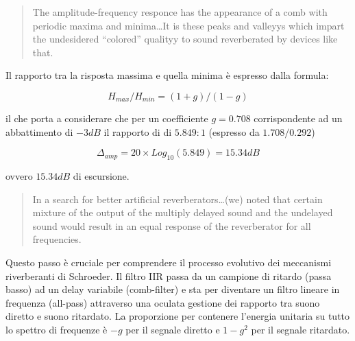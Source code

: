 \begin{refsection}
\begin{quote}
  The amplitude-frequency responce has the appearance of a comb with periodic
  maxima and minima\ldots It is these peaks and valleyys which impart the undesidered
  “colored” qualityy to sound reverberated by devices like that.
\end{quote}

Il rapporto tra la risposta massima e quella minima è espresso dalla formula:

\begin{equation}
  \label{comb-filter}
  H_{max}/H_{min} = (1+g)/(1-g)
\end{equation}

il che porta a considerare che per un coefficiente $g=0.708$ corrispondente ad
un abbattimento di $-3dB$ il rapporto di di $5.849:1$ (espresso da $1.708/0.292$)

\begin{equation}
  \label{hmax}
  \Delta_{amp} = 20\times Log_10(5.849) = 15.34 dB
\end{equation}

ovvero $15.34dB$ di escursione.

\begin{quote}
  In a search for better artificial reverberators\ldots (we) noted that certain
  mixture of the output of the multiply delayed sound and the undelayed sound
  would result in an equal response of the reverberator for all frequencies.
\end{quote}

Questo passo è cruciale per comprendere il processo evolutivo dei meccanismi
riverberanti di Schroeder. Il filtro IIR passa da un campione di ritardo (passa
basso) ad un delay variabile (comb-filter) e sta per diventare un filtro
lineare in frequenza (all-pass) attraverso una oculata gestione dei rapporto tra
suono diretto e suono ritardato. La proporzione per contenere l'energia unitaria
su tutto lo spettro di frequenze è $-g$ per il segnale diretto e $1-g^2$
per il segnale ritardato.


\end{refsection}
